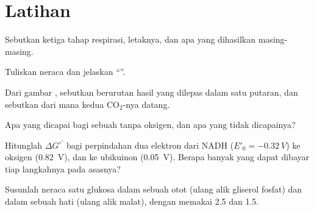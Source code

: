 \section{Latihan}

\begin{exercise}[$\star$]\label{exo:b1:respiration-fermentation:1}
Sebutkan ketiga tahap respirasi, letaknya, dan apa yang dihasilkan
masing-masing.
\end{exercise}

\begin{exercise}[$\star$]\label{exo:b1:respiration-fermentation:2}
Tuliskan neraca  dan jelaskan ``''.
\end{exercise}

\begin{exercise}[$\star$]\label{exo:b1:respiration-fermentation:3}
Dari gambar , sebutkan berurutan hasil yang dilepas dalam
satu putaran, dan sebutkan dari mana kedua $\mathrm{CO_2}$-nya datang.
\end{exercise}

\begin{exercise}[$\star$]\label{exo:b1:respiration-fermentation:4}
Apa yang dicapai  bagi sebuah  tanpa oksigen, dan apa yang
tidak dicapainya?
\end{exercise}

\begin{exercise}[$\star\star$]\label{exo:b1:respiration-fermentation:5}
Hitunglah $\Delta G^{\circ\prime}$ bagi perpindahan dua elektron dari
NADH ($E'_0 = \qty{-0.32}{V}$) ke oksigen (\qty{+0.82}{V}), dan ke
ubikuinon (\qty{+0.05}{V}). Berapa banyak  yang dapat dibayar tiap
langkahnya pada asasnya?
\end{exercise}

\begin{exercise}[$\star\star$]\label{exo:b1:respiration-fermentation:6}
Susunlah neraca  satu glukosa dalam sebuah  otot (ulang alik
gliserol fosfat) dan dalam sebuah  hati (ulang alik malat), dengan
memakai  2.5 dan 1.5.
\end{exercise}

